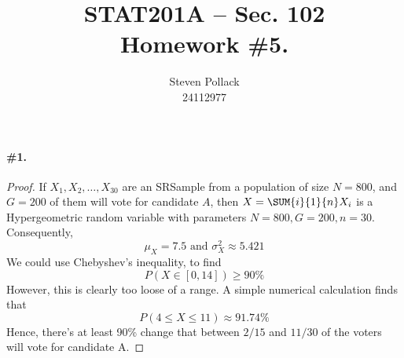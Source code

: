 \documentclass[12pt,titlepage]{article}
\title{STAT201A -- Sec. 102 \\ Homework \#5. }
\author{Steven Pollack \\ 24112977}
\date{}
\begin{document}
\maketitle

\pagestyle{empty}
\newpage
\pagestyle{fancy}

\paragraph{\#1.}
\begin{proof} If $X_1, X_2, \ldots, X_{30}$ are an SRSample from a population of size $N=800$, and $G=200$ of them will vote for candidate $A$, then $X = \SUM{i}{1}{n} X_i$ is a Hypergeometric random variable with parameters $N=800, G=200, n=30$. Consequently, 
\[
\mu_{X} = 7.5 \text{ and } \sigma_{X}^{2} \approx 5.421
\]
We could use Chebyshev's inequality, to find 
\[
P(X \in [0,14]) \geq 90\%
\]
However, this is clearly too loose of a range. A simple numerical calculation finds that 
\[
P( 4 \leq X \leq 11 ) \approx 91.74\%
\]
Hence, there's at least 90\% change that between $2/15$ and $11/30$ of the voters will vote for candidate A. 
\end{proof}
\end{document}
